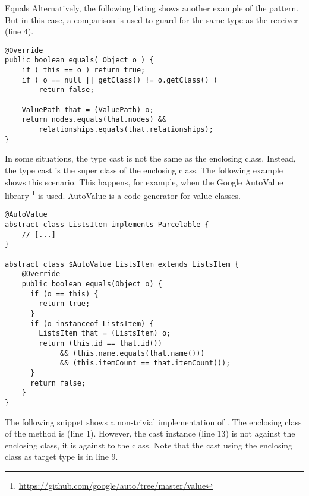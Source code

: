 \begin{pattern}{Equals}
Alternatively, the following listing%
\def\urlvar{http://bit.ly/neo4j_neo4j_2vKP0MW}
shows another example of the \thisp{} pattern.
But in this case,
a  comparison is used to guard for the same type as the receiver (line 4).

\begin{verbatim}
@Override
public boolean equals( Object o ) {
    if ( this == o ) return true;
    if ( o == null || getClass() != o.getClass() )
        return false;

    ValuePath that = (ValuePath) o;
    return nodes.equals(that.nodes) &&
        relationships.equals(that.relationships);
}
\end{verbatim}

In some situations, the type cast is not the same as the enclosing class.
Instead, the type cast is the super class of the enclosing class.
The following example%
\def\urlvar{http://bit.ly/square_sqlbrite_2HmHMYE}
shows this scenario.
This happens, for example, when the Google AutoValue library%
\footnote{\url{https://github.com/google/auto/tree/master/value}}
is used.
AutoValue is a code generator for value classes.

\begin{verbatim}
@AutoValue
abstract class ListsItem implements Parcelable {
    // [...]
}

abstract class $AutoValue_ListsItem extends ListsItem {
    @Override
    public boolean equals(Object o) {
      if (o == this) {
        return true;
      }
      if (o instanceof ListsItem) {
        ListsItem that = (ListsItem) o;
        return (this.id == that.id())
             && (this.name.equals(that.name()))
             && (this.itemCount == that.itemCount());
      }
      return false;
    }
}
\end{verbatim}

The following snippet%
\def\urlvar{http://bit.ly/bndtools_bnd_2SM5pOw}
shows a non-trivial implementation of .
The enclosing class of the  method is  (line 1).
However, the cast instance (line 13) is not against the enclosing class,
it is against to the  class.
Note that the cast using the enclosing class as target type is in line 9.


\end{pattern}

